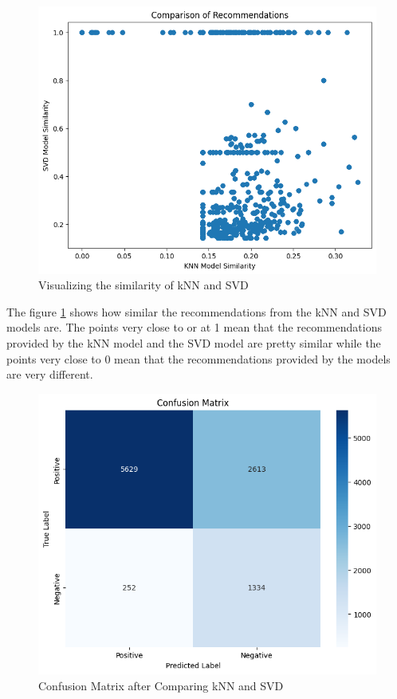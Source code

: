 \begin{figure}[h]
        \centering
        \includegraphics[width=1\linewidth]{img/Graphics/sim-plot.png}
        \caption{Visualizing the similarity of kNN and SVD}
        \label{sim-plot}
    \end{figure}

    \newpage

The figure \ref{sim-plot} shows how similar the recommendations from the kNN and SVD models are. The points very close to or at 1 mean that the recommendations provided by the kNN model and the SVD model are pretty similar while the points very close to 0 mean that the recommendations provided by the models are very different.

\begin{figure}[h]
        \centering
        \includegraphics[width=1\linewidth]{img/Graphics/conf-knn-svd.png}
        \caption{Confusion Matrix after Comparing kNN and SVD}
        \label{conf-knn-svd}
    \end{figure}

